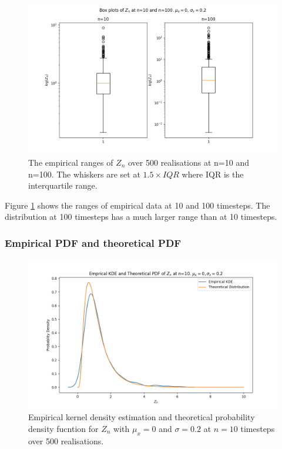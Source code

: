 \documentclass{article}
\begin{document}
\begin{figure}[H]
\includegraphics[scale=0.5]{box_plots_a.png} 
\caption{The empirical ranges of $Z_n$ over 500 realisations at n=10 and n=100. The whiskers are set at $1.5 \times IQR$ where IQR is the interquartile range.}
\label{fig:boxplots}
\end{figure}

Figure \ref{fig:boxplots} shows the ranges of empirical data at 10 and 100 timesteps. The distribution at 100 timesteps has a much larger range than at 10 timesteps.

\subsubsection{Empirical PDF and theoretical PDF}

\begin{figure}[H]
\includegraphics[scale=0.5]{empirical_pdf_kde_10_a.png} 
\caption{Empirical kernel density estimation and theoretical probability density fucntion for $Z_n$ with $\mu_x=0$ and $\sigma=0.2$ at $n=10$ timesteps over 500 realisations.}
\label{fig:kde_10}
\end{figure}
\end{document}
